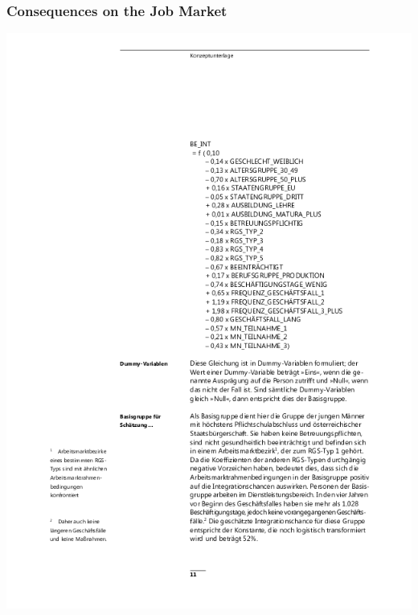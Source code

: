 \documentclass[aspectratio=169,x11names]{beamer}
\begin{document}
\begin{frame}
\frametitle{Consequences on the Job Market}
\begin{minipage}{.5\textwidth}
\begin{center}
\includegraphics[height=0.75\textheight, keepaspectratio]{images/negativfaktor}
\end{center}
\end{minipage}\begin{minipage}{.5\textwidth}
\begin{center}

\end{center}
\end{minipage}
\end{frame}
\end{document}
